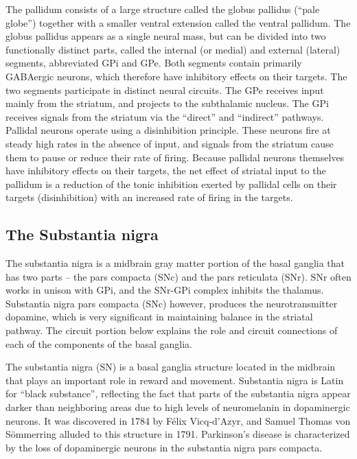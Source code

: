 The pallidum consists of a large structure called the globus pallidus (``pale globe'') together with a smaller ventral extension called the ventral pallidum. The globus pallidus appears as a single neural mass, but can be divided into two functionally distinct parts, called the internal (or medial) and external (lateral) segments, abbreviated GPi and GPe. Both segments contain primarily GABAergic neurons, which therefore have inhibitory effects on their targets. The two segments participate in distinct neural circuits. The GPe receives input mainly from the striatum, and projects to the subthalamic nucleus. The GPi receives signals from the striatum via the ``direct'' and ``indirect'' pathways. Pallidal neurons operate using a disinhibition principle. These neurons fire at steady high rates in the absence of input, and signals from the striatum cause them to pause or reduce their rate of firing. Because pallidal neurons themselves have inhibitory effects on their targets, the net effect of striatal input to the pallidum is a reduction of the tonic inhibition exerted by pallidal cells on their targets (disinhibition) with an increased rate of firing in the targets.

\hypertarget{the-substantia-nigra-1}{%
\subsection{The Substantia nigra}\label{the-substantia-nigra-1}}

The substantia nigra is a midbrain gray matter portion of the basal ganglia that has two parts -- the pars compacta (SNc) and the pars reticulata (SNr). SNr often works in unison with GPi, and the SNr-GPi complex inhibits the thalamus. Substantia nigra pars compacta (SNc) however, produces the neurotransmitter dopamine, which is very significant in maintaining balance in the striatal pathway. The circuit portion below explains the role and circuit connections of each of the components of the basal ganglia.

The substantia nigra (SN) is a basal ganglia structure located in the midbrain that plays an important role in reward and movement. Substantia nigra is Latin for ``black substance'', reflecting the fact that parts of the substantia nigra appear darker than neighboring areas due to high levels of neuromelanin in dopaminergic neurons. It was discovered in 1784 by Félix Vicq-d'Azyr, and Samuel Thomas von Sömmerring alluded to this structure in 1791. Parkinson's disease is characterized by the loss of dopaminergic neurons in the substantia nigra pars compacta.

